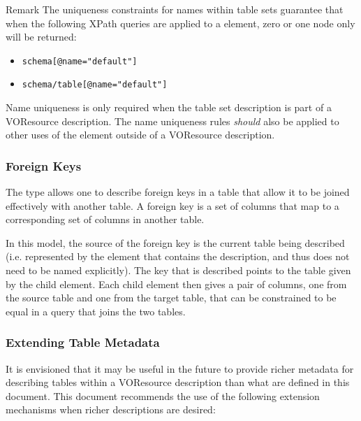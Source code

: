 \documentclass[11pt,a4paper]{ivoa}
\begin{document}
\begin{admonition}{Remark}
The uniqueness constraints for names
within table sets guarantee that when the following XPath queries are
applied to a  element, zero or one node
only will be returned:

\begin{itemize}
\item\verb|schema[@name="default"]|
\item\verb|schema/table[@name="default"]|
\end{itemize}
\end{admonition}

Name uniqueness is only required when the table set description is
part of a VOResource description.  The name uniqueness rules
\emph{should} also be applied to other uses of the
 element outside of a VOResource
description.  


\subsubsection{Foreign Keys}
\label{sect:fkey}


The  type allows one to describe foreign
keys in a table that allow it to be joined effectively with another
table.  A foreign key is a set of columns that map to a corresponding
set of columns in another table.  




In this model, the source of the foreign
key is the current table being described (i.e. represented by the
 element that contains the
 description, and thus does not need to be
named explicitly).  The key that is described points to the table
given by the  child element.  Each child
 element then gives a pair of columns, one
from the source table and one from the target table, that can be
constrained to be equal in a query that joins the two tables.  






\subsubsection{Extending Table Metadata}
\label{sect:tblext}

It is envisioned that it may be useful in the future to provide richer
metadata for describing tables within a VOResource description than
what are defined in this document.  This document recommends the
use of the following extension mechanisms when richer descriptions are
desired:
\end{document}
